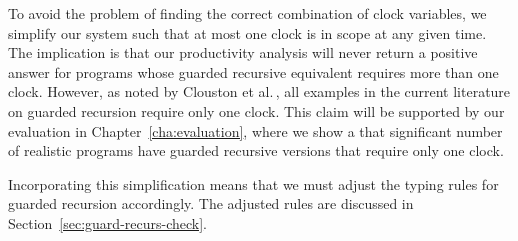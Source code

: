 To avoid the problem of finding the correct combination of clock variables, we
simplify our system such that at most one clock is in scope at any given
time. The implication is that our productivity analysis will never return a
positive answer for programs whose guarded recursive equivalent requires more
than one clock. However, as noted by Clouston et
al.\,\citep{BirkedalL:guarded-lambda-conf}, all examples in the current
literature on guarded recursion require only one clock. This claim will be
supported by our evaluation in Chapter~\ref{cha:evaluation}, where we show a
that significant number of realistic programs have guarded recursive versions
that require only one clock. 

Incorporating this simplification means that we
must adjust the typing rules for guarded recursion accordingly. The adjusted
rules are discussed in Section~\ref{sec:guard-recurs-check}. 




